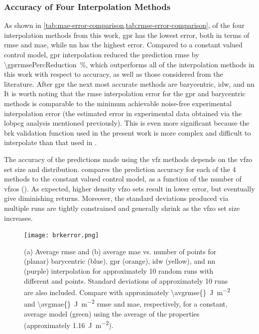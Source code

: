 \documentclass[final,twocolumn,12pt]{elsarticle}
\begin{document}
\subsubsection{Accuracy of Four Interpolation Methods}
As shown in \cref{tab:mae-error-comparison,tab:rmse-error-comparison}, of the four interpolation methods from this work, \Gls{gpr} has the lowest error, both in terms of \gls{rmse} and \gls{mae}, while \gls{nn} has the highest error. Compared to a constant valued control model, \gls{gpr} interpolation reduced the prediction \gls{rmse} by \SI{\gprrmsePercReduction}{\percent}, which outperforms all of the interpolation methods in this work with respect to accuracy, as well as those considered from the literature. After \gls{gpr} the next most accurate methods are barycentric,
\gls{idw}, and \gls{nn}
It is worth noting that the \gls{rmse} interpolation error for the \gls{gpr} and barycentric methods is comparable to the minimum achievable noise-free experimental interpolation error (the estimated error in experimental data obtained via the \gls{lobpcg} analysis mentioned previously). This is even more significant because the \gls{brk} validation function used in the present work is more complex and difficult to interpolate than that used in \cite{shenDeterminingGrainBoundary2019}.

The accuracy of the predictions made using the \gls{vfz} methods depends on the \gls{vfzo} set size and distribution. %
 compares the prediction accuracy for each of the 4 methods to the constant valued control model, as a function of the number of \inpt{} \glspl{vfzo} (). As expected, higher density \gls{vfzo} sets result in lower error, but eventually give diminishing returns. Moreover, the standard deviations produced via multiple runs are tightly constrained and generally shrink as the \gls{vfzo} set size increases. 
\begin{figure}
    \centering
    \texttt{[image: brkerror.png]}
    \caption{(a) Average \gls{rmse} and (b) average \gls{mae} vs. number of \inpt{} points for (planar) barycentric (blue), \gls{gpr} (orange), \gls{idw} (yellow), and \gls{nn} (purple) interpolation for approximately 10 random runs with different \inpt{} and \outpt{} points. Standard deviations of approximately 10 runs are also included. Compare with approximately \SI{\avgrmse{}}{\J\per\square\meter} and \SI{\avgmae{}}{\J\per\square\meter} \gls{rmse} and \gls{mae}, respectively, for a constant, average model (green) using the average of the \inpt{} properties (approximately \SI{1.16}{\J\per\square\meter}).}
    \label{fig:brkerror}
\end{figure}
\end{document}
